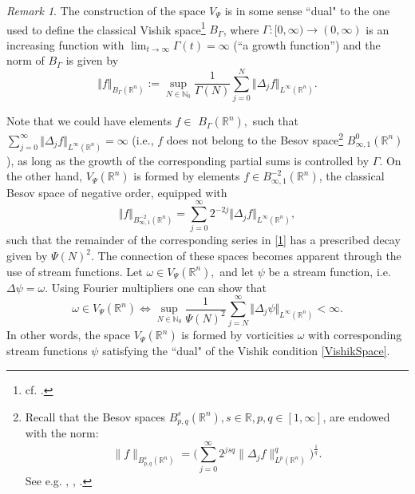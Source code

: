 \documentclass[11pt, a4paper,leqno]{amsart}
\theoremstyle{plain}
\numberwithin{equation}{section}
\theoremstyle{definition}
\theoremstyle{remark}
\newtheorem{remark}{Remark}
\def\R{\mathbb{R}}
\begin{document}
\begin{remark}
\label{Remark1} The construction of the space $V_{\Psi}$ is in some sense
``dual" to the one used to define the classical Vishik space\footnote{cf.
\cite{DMEuler}.} $B_{\Gamma}$, where $\Gamma:[0,\infty)\rightarrow(0,\infty)$
is an increasing function with $\lim_{t \to \infty} \Gamma(t) = \infty$ (\textquotedblleft a growth
function\textquotedblright) and the norm of $B_{\Gamma}$ is given by
\begin{equation}
\Vert f\Vert_{B_{\Gamma}(\mathbb{R}^{n})}:=\sup_{N\in\mathbb{N}_{0}}\frac
{1}{\Gamma(N)}\sum_{j=0}^{N}\Vert\Delta_{j}f\Vert_{L^{\infty}(\mathbb{R}^{n}%
)}.\label{VishikSpace}%
\end{equation}


Note that we could have elements $f\in$ $B_{\Gamma}(\R^n),$ such that $\sum
_{j=0}^{\infty}\Vert\Delta_{j}f\Vert_{L^{\infty}(\mathbb{R}^{n})}=\infty$ (i.e., $f$ does not belong to the Besov space\footnote{Recall that the Besov spaces $B^s_{p, q}(\R^n), s \in \R, p, q \in [1, \infty]$, are endowed with the norm:
$$
	\|f\|_{B^s_{p, q}(\R^n)} = \bigg(\sum_{j=0}^\infty 2^{j s q} \|\Delta_j f\|^q_{L^p(\R^n)} \bigg)^{\frac{1}{q}}.
$$
See e.g. \cite{S70}, \cite{BS88}, \cite{Triebel}.
}  $B_{\infty,1}^{0}(\mathbb{R}^{n})$),  as long as the growth of
the corresponding partial sums is controlled by $\Gamma$. On the other hand,
$V_{\Psi}(\mathbb{R}^{n})$ is formed by elements $f\in B_{\infty,1}%
^{-2}(\mathbb{R}^{n})$, the classical Besov space of negative order, equipped
with
\begin{equation}
\Vert f\Vert_{B_{\infty,1}^{-2}(\mathbb{R}^{n})}=\sum_{j=0}^{\infty}%
2^{-2j}\Vert\Delta_{j}f\Vert_{L^{\infty}(\mathbb{R}^{n})},\label{1}%
\end{equation}
such that the remainder of the corresponding series in \eqref{1} has a
prescribed decay given by $\Psi(N)^{2}$. The connection of these spaces
becomes apparent through the use of stream functions. Let $\omega\in V_{\Psi
}(\R^n),$ and let $\psi$ be a stream function, i.e. $\Delta\psi=\omega.$ Using
Fourier multipliers one can show that
\[
\omega\in V_{\Psi}(\R^n) \iff\sup_{N\in\mathbb{N}_{0}}\frac{1}{\Psi(N)^{2}}\sum
_{j=N}^{\infty}\Vert\Delta_{j}\psi\Vert_{L^{\infty}(\mathbb{R}^{n})}<\infty.
\]
In other words, the space $V_{\Psi}(\R^n)$ is formed by vorticities $\omega$ with
corresponding stream functions $\psi$ satisfying the \textquotedblleft dual" of the 
Vishik condition  \eqref{VishikSpace}.
\end{remark}
\end{document}
